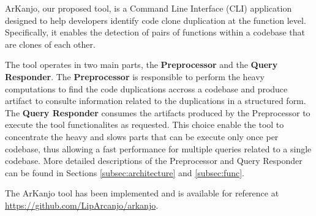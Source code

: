\en

ArKanjo, our proposed tool, is a Command Line Interface (CLI) application designed to
help developers identify code clone duplication at the function level.
Specifically, it enables the detection of pairs of functions within a codebase
that are clones of each other.

The tool operates in two main parts, the \textbf{Preprocessor} and the \textbf{Query Responder}. 
The \textbf{Preprocessor} is responsible to perform the heavy computations to find the code duplications 
accross a codebase and produce artifact to consulte information related to the duplications in a structured form.
The \textbf{Query Responder} consumes the artifacts produced by the Preprocessor to execute the tool functionalites as requested.
This choice enable the tool to concentrate the heavy and slows parts that can be execute only once per codebase, 
thus allowing a fast performance for multiple queries related to a single codebase.
More detailed descriptions of the Preprocessor and Query Responder can be found in
Sections \ref{subsec:architecture} and \ref{subsec:func}.

The ArKanjo tool has been implemented and is available for reference at
\url{https://github.com/LipArcanjo/arkanjo}.
